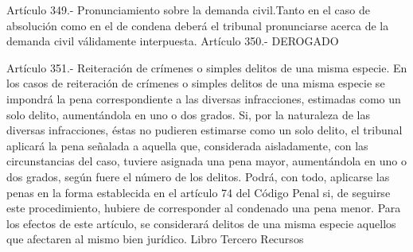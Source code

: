     Artículo 349.- Pronunciamiento sobre la demanda civil.Tanto en el caso de absolución como en el de condena deberá el tribunal pronunciarse acerca de la demanda civil válidamente interpuesta.
    Artículo 350.- DEROGADO

    Artículo 351.- Reiteración de crímenes o simples delitos de una misma especie. En los casos de reiteración de crímenes o simples delitos de una misma especie se impondrá la pena correspondiente a las diversas infracciones, estimadas como un solo delito, aumentándola en uno o dos grados.
    Si, por la naturaleza de las diversas infracciones, éstas no pudieren estimarse como un solo delito, el tribunal aplicará la pena señalada a aquella que, considerada aisladamente, con las circunstancias del caso, tuviere asignada una pena mayor, aumentándola en uno o dos grados, según fuere el número de los delitos.
    Podrá, con todo, aplicarse las penas en la forma establecida en el artículo 74 del Código Penal si, de seguirse este procedimiento, hubiere de corresponder al condenado una pena menor.
    Para los efectos de este artículo, se considerará delitos de una misma especie aquellos que afectaren al mismo bien jurídico.
    Libro Tercero
    Recursos

